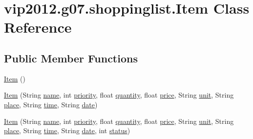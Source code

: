 \hypertarget{classvip2012_1_1g07_1_1shoppinglist_1_1Item}{\section{vip2012.\-g07.\-shoppinglist.\-Item Class Reference}
\label{classvip2012_1_1g07_1_1shoppinglist_1_1Item}
}
\subsection*{Public Member Functions}
\begin{DoxyCompactItemize}
\item 
\hyperlink{classvip2012_1_1g07_1_1shoppinglist_1_1Item_a331ca4db4762134e5c6d542c893ba17b}{Item} ()
\item 
\hyperlink{classvip2012_1_1g07_1_1shoppinglist_1_1Item_a29ab6c8b6d97c0b40e7ec19df1f49bf9}{Item} (String \hyperlink{classvip2012_1_1g07_1_1shoppinglist_1_1Item_aee17888b6e1d30bce7a81aaffe6f053d}{name}, int \hyperlink{classvip2012_1_1g07_1_1shoppinglist_1_1Item_ac1ca4e71eccba9e5e100c9a45daca8df}{priority}, float \hyperlink{classvip2012_1_1g07_1_1shoppinglist_1_1Item_adaeae2e873d9f91312553f61ba6f8de6}{quantity}, float \hyperlink{classvip2012_1_1g07_1_1shoppinglist_1_1Item_a52428d91c54c43ccf1394efb3b1da5f3}{price}, String \hyperlink{classvip2012_1_1g07_1_1shoppinglist_1_1Item_a3d919fb6d4c95e347f5c00c12436948f}{unit}, String \hyperlink{classvip2012_1_1g07_1_1shoppinglist_1_1Item_a4797cd0f0a38d957689314e8e1691b86}{place}, String \hyperlink{classvip2012_1_1g07_1_1shoppinglist_1_1Item_a4b3f6f3899f0211bf3e6532ed607b710}{time}, String \hyperlink{classvip2012_1_1g07_1_1shoppinglist_1_1Item_ad058fdff8f1e5fe4d8cb9db18df8bf7b}{date})
\item 
\hyperlink{classvip2012_1_1g07_1_1shoppinglist_1_1Item_ad23d924fd73b1f5a34cb1e7f0d1c12b2}{Item} (String \hyperlink{classvip2012_1_1g07_1_1shoppinglist_1_1Item_aee17888b6e1d30bce7a81aaffe6f053d}{name}, int \hyperlink{classvip2012_1_1g07_1_1shoppinglist_1_1Item_ac1ca4e71eccba9e5e100c9a45daca8df}{priority}, float \hyperlink{classvip2012_1_1g07_1_1shoppinglist_1_1Item_adaeae2e873d9f91312553f61ba6f8de6}{quantity}, float \hyperlink{classvip2012_1_1g07_1_1shoppinglist_1_1Item_a52428d91c54c43ccf1394efb3b1da5f3}{price}, String \hyperlink{classvip2012_1_1g07_1_1shoppinglist_1_1Item_a3d919fb6d4c95e347f5c00c12436948f}{unit}, String \hyperlink{classvip2012_1_1g07_1_1shoppinglist_1_1Item_a4797cd0f0a38d957689314e8e1691b86}{place}, String \hyperlink{classvip2012_1_1g07_1_1shoppinglist_1_1Item_a4b3f6f3899f0211bf3e6532ed607b710}{time}, String \hyperlink{classvip2012_1_1g07_1_1shoppinglist_1_1Item_ad058fdff8f1e5fe4d8cb9db18df8bf7b}{date}, int \hyperlink{classvip2012_1_1g07_1_1shoppinglist_1_1Item_a5c56e93b88819efd504f517868274de3}{status})

\end{DoxyCompactItemize}
